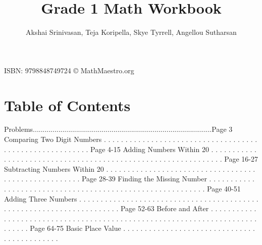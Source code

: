 \documentclass{article}%
\title{Grade 1 Math Workbook}%
\author{Akshai Srinivasan, Teja Koripella, Skye Tyrrell, Angellou Sutharsan}%
\date{}%
\begin{document}
%
\normalsize%
\maketitle%
\vfill%
\begin{center}%
ISBN: 9798848749724%
\linebreak%
\copyright%
MathMaestro.org%
\end{center}%
\newpage%
\section{Table of Contents}%
\label{sec:TableofContents}%
Problems...........................................................................................Page 3%
\newline%
Comparing Two Digit Numbers%
.%
.%
.%
.%
.%
.%
.%
.%
.%
.%
.%
.%
.%
.%
.%
.%
.%
.%
.%
.%
.%
.%
.%
.%
.%
.%
.%
.%
.%
.%
.%
.%
.%
.%
.%
.%
.%
.%
.%
.%
.%
.%
.%
.%
.%
.%
.%
.%
.%
.%
.%
.%
.%
.%
.%
.%
Page 4{-}15%
\newline%
Adding Numbers Within 20%
.%
.%
.%
.%
.%
.%
.%
.%
.%
.%
.%
.%
.%
.%
.%
.%
.%
.%
.%
.%
.%
.%
.%
.%
.%
.%
.%
.%
.%
.%
.%
.%
.%
.%
.%
.%
.%
.%
.%
.%
.%
.%
.%
.%
.%
.%
.%
.%
.%
.%
.%
.%
.%
.%
.%
.%
.%
.%
.%
.%
.%
.%
Page 16{-}27%
\newline%
Subtracting Numbers Within 20%
.%
.%
.%
.%
.%
.%
.%
.%
.%
.%
.%
.%
.%
.%
.%
.%
.%
.%
.%
.%
.%
.%
.%
.%
.%
.%
.%
.%
.%
.%
.%
.%
.%
.%
.%
.%
.%
.%
.%
.%
.%
.%
.%
.%
.%
.%
.%
.%
.%
.%
.%
.%
.%
Page 28{-}39%
\newline%
Finding the Missing Number%
.%
.%
.%
.%
.%
.%
.%
.%
.%
.%
.%
.%
.%
.%
.%
.%
.%
.%
.%
.%
.%
.%
.%
.%
.%
.%
.%
.%
.%
.%
.%
.%
.%
.%
.%
.%
.%
.%
.%
.%
.%
.%
.%
.%
.%
.%
.%
.%
.%
.%
.%
.%
.%
.%
.%
.%
.%
.%
Page 40{-}51%
\newline%
Adding Three Numbers%
.%
.%
.%
.%
.%
.%
.%
.%
.%
.%
.%
.%
.%
.%
.%
.%
.%
.%
.%
.%
.%
.%
.%
.%
.%
.%
.%
.%
.%
.%
.%
.%
.%
.%
.%
.%
.%
.%
.%
.%
.%
.%
.%
.%
.%
.%
.%
.%
.%
.%
.%
.%
.%
.%
.%
.%
.%
.%
.%
.%
.%
.%
.%
.%
.%
.%
.%
.%
.%
Page 52{-}63%
\newline%
Before and After%
.%
.%
.%
.%
.%
.%
.%
.%
.%
.%
.%
.%
.%
.%
.%
.%
.%
.%
.%
.%
.%
.%
.%
.%
.%
.%
.%
.%
.%
.%
.%
.%
.%
.%
.%
.%
.%
.%
.%
.%
.%
.%
.%
.%
.%
.%
.%
.%
.%
.%
.%
.%
.%
.%
.%
.%
.%
.%
.%
.%
.%
.%
.%
.%
.%
.%
.%
.%
.%
.%
.%
.%
.%
.%
.%
.%
Page 64{-}75%
\newline%
Basic Place Value%
.%
.%
.%
.%
.%
.%
.%
.%
.%
.%
.%
.%
.%
.%
.%
.%
.%
.%
.%
.%
.%
.%
.%
.%
.%
.%
.%
.%
.%
.%
.%
.%
.%
.%
.%
.%
.%
.%
.%
.%
.%
.%
.%
.%
\end{document}
